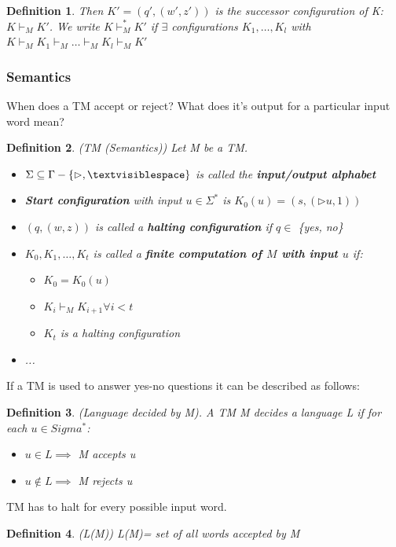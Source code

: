 \documentclass[a3paper, 8pt]{extarticle}
\newtheorem*{definition}{Definition}
\begin{document}
\begin{multicols*}{6}
\begin{definition}
     Then $K'=(q',(w',z'))$ is the successor configuration of K: $K \vdash_M K'$. We write $K \vdash_M^* K'$ if $\exists$ configurations $K_1, \dots, K_l$ with $K \vdash_M K_1 \vdash_M \dots \vdash_M K_l \vdash_M K'$
\end{definition}
\subsubsection{Semantics} When does a TM accept or reject? What does it's output for a particular input word mean?
\begin{definition}
    (TM (Semantics)) Let M be a TM. \begin{itemize}
        \item $\Sigma \subseteq \Gamma - \{\rhd, \textvisiblespace \}$ is called the \textbf{input/output alphabet}
        \item \textbf{Start configuration} with input $u \in \Sigma^*$ is $K_0(u)=(s,(\rhd u, 1))$
        \item $(q,(w,z))$ is called a \textbf{halting configuration} if $q \in$ \{yes, no\}
        \item $K_0, K_1, \dots, K_t$ is called a \textbf{finite computation of $M$ with input $u$} if: \begin{itemize}
            \item $K_0=K_0(u)$
            \item $K_i \vdash_M K_{i+1} \forall i<t$
            \item $K_t$ is a halting configuration
        \end{itemize}
        \item ...
    \end{itemize}
\end{definition}

If a TM is used to answer yes-no questions it can be described as follows:

\begin{definition}
    (Language decided by M). A TM M decides a language L if for each $u \in Sigma^*$: \begin{itemize}
        \item $u \in L \implies$ M accepts u
        \item $u \notin L \implies$ M rejects u 
    \end{itemize}
\end{definition}
TM has to halt for every possible input word.

\begin{definition}
    (L(M)) L(M)= set of all words accepted by M
\end{definition}

\end{multicols*}
\end{document}
